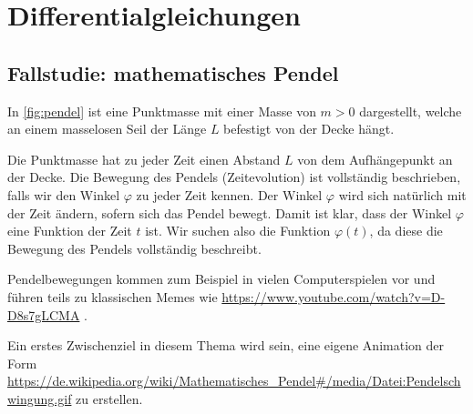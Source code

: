 \chapter{Differentialgleichungen}\label{ch:Differentialgleichungen}

\section{Fallstudie: mathematisches Pendel}
In \cref{fig:pendel} ist eine Punktmasse mit einer Masse von $m>0$ dargestellt, welche an einem masselosen Seil der Länge $L$ befestigt von der Decke hängt.

\par
Die Punktmasse hat zu jeder Zeit einen Abstand $L$ von dem Aufhängepunkt an der Decke. Die Bewegung des Pendels (Zeitevolution) ist vollständig beschrieben, falls wir den Winkel $\varphi$ zu jeder Zeit kennen. Der Winkel $\varphi$ wird sich natürlich mit der Zeit ändern, sofern sich das Pendel bewegt. Damit ist klar, dass der Winkel $\varphi$ eine Funktion der Zeit $t$ ist. Wir suchen also die Funktion $\varphi(t)$, da diese die Bewegung des Pendels vollständig beschreibt.

\par
Pendelbewegungen kommen zum Beispiel in vielen Computerspielen vor und führen teils zu klassischen Memes wie \url{https://www.youtube.com/watch?v=D-D8s7gLCMA} .

\par
Ein erstes Zwischenziel in diesem Thema wird sein, eine eigene Animation der Form \url{https://de.wikipedia.org/wiki/Mathematisches_Pendel#/media/Datei:Pendelschwingung.gif} zu erstellen.

